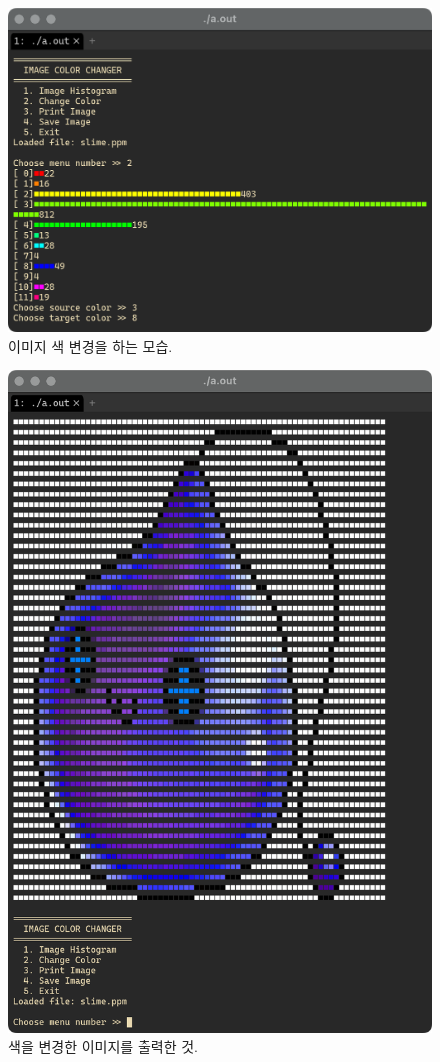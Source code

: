 \documentclass[titlepage]{article}
\begin{document}
\begin{figure}[H]
  \centering
  \includegraphics[width=0.7\linewidth]{change_color.png}
  \caption{이미지 색 변경을 하는 모습.}
\end{figure}

\begin{figure}[H]
  \centering
  \includegraphics[width=0.7\linewidth]{change_color_result.png}
  \caption{색을 변경한 이미지를 출력한 것.}
\end{figure}
\end{document}
